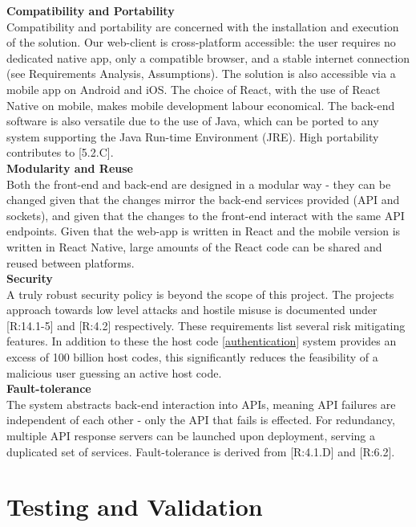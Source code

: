 \documentclass[9pt, titlepage]{extarticle}
\begin{document}
\textbf{Compatibility and Portability}\\
Compatibility and portability are concerned with the installation and execution of the solution. 
Our web-client is cross-platform accessible: the user requires no dedicated native app, only a compatible browser, and a stable internet connection (see Requirements Analysis, Assumptions). The solution is also accessible via a mobile app on Android and iOS. The choice of React, with the use of React Native on mobile,  makes mobile development labour economical. The back-end software is also versatile due to the use of Java, which can be ported to any system supporting the Java Run-time Environment (JRE). High portability contributes to [5.2.C]. \\

\textbf{Modularity and Reuse}\\
Both the front-end and back-end are designed in a modular way - they can be changed given that the changes mirror the back-end services provided (API and sockets), and given that the changes to the front-end interact with the same API endpoints. Given that the web-app is written in React and the mobile version is written in React Native, large amounts of the React code can be shared and reused between platforms. \\

\textbf{Security}\\
A truly robust security policy is beyond the scope of this project. The projects approach towards low level attacks and hostile misuse is documented under [R:14.1-5] and [R:4.2] respectively. These requirements list several risk mitigating features. In addition to these the host code \hyperref[auth]{[authentication]} system provides an excess of 100 billion host codes, this significantly reduces the feasibility of a malicious user guessing an active host code.\\

\textbf{Fault-tolerance}\\
The system abstracts back-end interaction into APIs, meaning API failures are independent of each other - only the API that fails is effected. For redundancy, multiple API response servers can be launched upon deployment, serving a duplicated set of services. Fault-tolerance is derived from [R:4.1.D] and [R:6.2].

\section{Testing and Validation}
\end{document}
